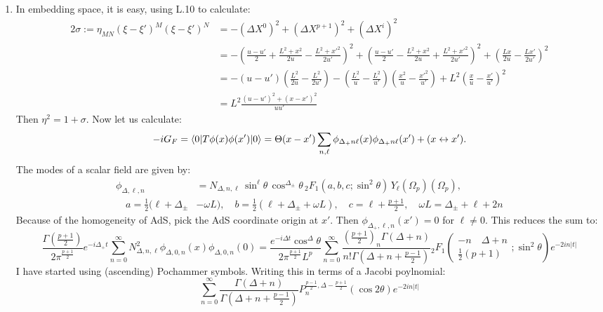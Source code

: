 \documentclass[11pt, class=article, crop=false]{standalone}
\begin{document}
\begin{enumerate}
	
	\item In embedding space, it is easy, using L.10 to calculate:
	\[
		\begin{aligned}
			2\sigma := \eta_{MN} (\xi - \xi')^M (\xi - \xi')^N &= -(\Delta X^0)^2 + (\Delta X^{p+1})^2 + (\Delta X^i)^2 \\
			&= -\left(\tfrac{u-u'}{2} + \tfrac{L^2 + x^2}{2u} - \tfrac{L^2 + {x'}^2}{2u'}\right)^2 
			+ \left(\tfrac{u-u'}{2} -  \tfrac{L^2 + x^2}{2u} + \tfrac{L^2 + {x'}^2}{2u'}\right)^2 + \left(\tfrac{L x}{2u} - \tfrac{L x'}{2u'} \right)^2\\
			&= - (u-u')\left(\frac{L^2}{2u} - \frac{L^2}{2u'} \right) - \left(\frac{L^2}{u} - \frac{L^2}{u'} \right) \left(\frac{x^2}{u} - \frac{{x'}^2}{u'} \right) + L^2 \left(\frac{x}{u} - \frac{x'}{u'} \right)^2\\
			&= L^2 \frac{(u-u')^2 + (x-x')^2}{u u'}
		\end{aligned}
	\]
	Then $\eta^2 = 1+\sigma$. Now let us calculate:
	\[
		-iG_F = \braket{0| T \phi(x) \phi(x')| 0} =  \Theta(x-x')\sum_{n, \ell} \phi_{\Delta_+ n \ell}(x) \phi_{\Delta_+ n \ell}(x') + (x \leftrightarrow x').
	\]
	The modes of a scalar field are given by:
	\[
	\begin{aligned}
		\phi_{\Delta, \ell, n} &=  N_{\Delta, n, \ell} \, \sin^\ell \theta\, \cos^{\Delta_\pm} \theta\, {_2F_1}(a, b, c; \sin^2 \theta) \, Y_{\ell}(\Omega_p) (\Omega_p),\\ \quad a = \frac12 (\ell + \Delta_{\pm}& - \omega L), \quad b = \frac12 (\ell + \Delta_{\pm} + \omega L),\quad c = \ell+\frac{p+1}{2}, \quad \omega L = \Delta_\pm + \ell + 2n
	\end{aligned}
	\] 
	Because of the homogeneity of AdS, pick the AdS coordinate origin at $x'$. Then $\phi_{\Delta_+, \ell, n}(x') = 0$ for $\ell \neq 0$. This reduces the sum to:
	\[
		\frac{\Gamma(\frac{p+1}{2})}{2 \pi^{\frac{p+1}{2}}} e^{-i \Delta_+ t}\sum_{n=0}^\infty N_{\Delta, n, \ell}^2 \phi_{\Delta, 0, n}(x) \phi_{\Delta, 0, n}(0) = \frac{e^{-i \Delta t} \cos^{\Delta} \theta}{2 \pi^{\frac{p+1}{2}} L^p} \sum_{n=0}^\infty \frac{(\frac{p+1}{2})_n \Gamma(\Delta + n)}{n! \Gamma(\Delta + n + \frac{p-1}{2})} {_2F_1}\left(\begin{matrix}
			-n \quad  \Delta + n\\ \frac12(p+1)
		\end{matrix}; \sin^2 \theta \right) e^{-2 i n |t|}
	\]
	I have started using (ascending) Pochammer symbols. 
	Writing this in terms of a Jacobi poylnomial:
	\[
		\sum_{n=0}^\infty \frac{\Gamma(\Delta + n)}{\Gamma(\Delta + n + \frac{p-1}{2})} P^{\frac{p-1}{2}, \Delta - \frac{p+1}{2}}_n (\cos 2 \theta) e^{-2 i n |t|}
\]
\end{enumerate}
\end{document}
